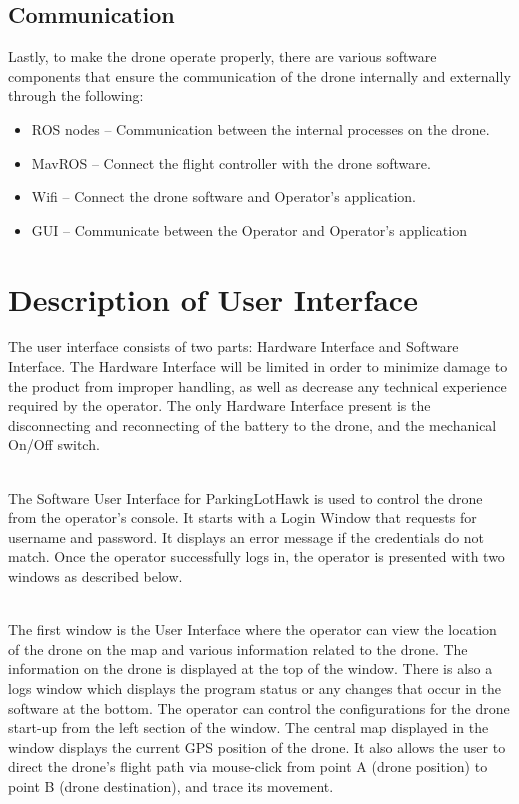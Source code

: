 \documentclass[12pt]{article}
\begin{document}
\subsection{Communication}

Lastly, to make the drone operate properly, there are various software components that ensure the communication of the drone internally and externally through the following:

\begin{itemize}
    \item ROS nodes – Communication between the internal processes on the drone.
    \item MavROS – Connect the flight controller with the drone software.
    \item Wifi – Connect the drone software and Operator’s application.
    \item GUI – Communicate between the Operator and Operator’s application
\end{itemize}

\section{Description of User Interface}


The user interface consists of two parts: Hardware Interface and Software Interface. The Hardware Interface will be limited in order to minimize damage to the product from improper handling, as well as decrease any technical experience required by the operator. The only Hardware Interface present is the disconnecting and reconnecting of the battery to the drone, and the mechanical On/Off switch. \\\

The Software User Interface for ParkingLotHawk is used to control the drone from the operator’s console. It starts with a Login Window that requests for username and password. It displays an error message if the credentials do not match. Once the operator successfully logs in, the operator is presented with two windows as described below. \\\

The first window is the User Interface where the operator can view the location of the drone on the map and various information related to the drone. The information on the drone is displayed at the top of the window. There is also a logs window which displays the program status or any changes that occur in the software at the bottom. The operator can control the configurations for the drone start-up from the left section of the window. The central map displayed in the window displays the current GPS position of the drone. It also allows the user to direct the drone's flight path via mouse-click from point A (drone position) to point B (drone destination), and trace its movement. \\\
\end{document}
